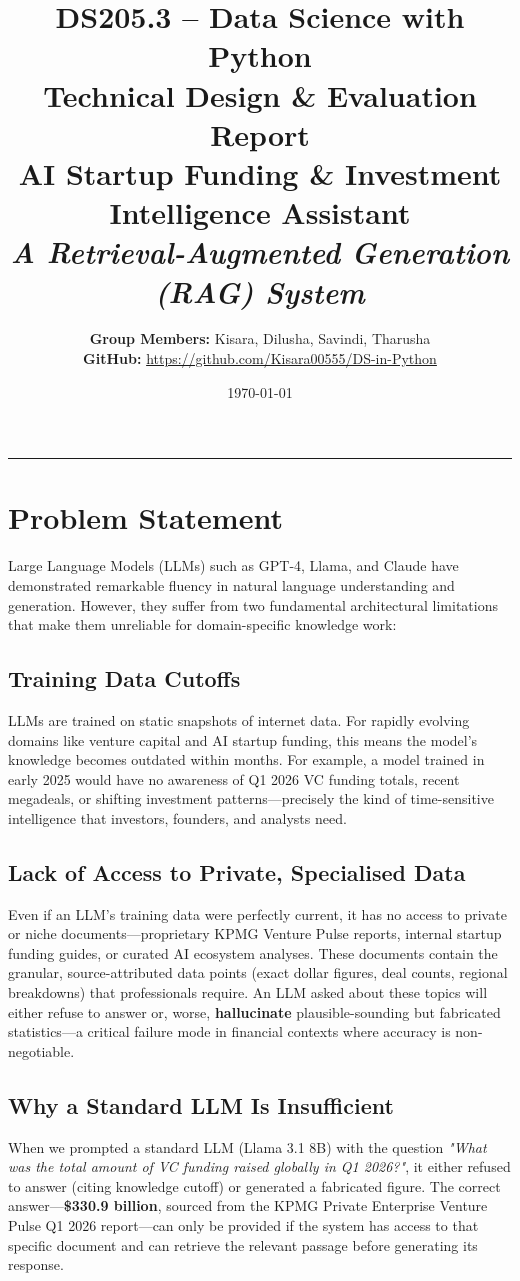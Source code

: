 \documentclass[11pt, a4paper]{article}
\title{
    \vspace{-1.5cm}
    \textbf{DS205.3 -- Data Science with Python} \\
    \Large Technical Design \& Evaluation Report \\
    \large AI Startup Funding \& Investment Intelligence Assistant \\
    \normalsize \textit{A Retrieval-Augmented Generation (RAG) System}
}
\author{\textbf{Group Members:} Kisara, Dilusha, Savindi, Tharusha \\
\small \textbf{GitHub:} \url{https://github.com/Kisara00555/DS-in-Python}}
\date{\today}
\begin{document}
\maketitle

\hrule
\vspace{0.5cm}

\section{Problem Statement}

Large Language Models (LLMs) such as GPT-4, Llama, and Claude have demonstrated remarkable fluency in natural language understanding and generation. However, they suffer from two fundamental architectural limitations that make them unreliable for domain-specific knowledge work:

\subsection{Training Data Cutoffs}
LLMs are trained on static snapshots of internet data. For rapidly evolving domains like venture capital and AI startup funding, this means the model's knowledge becomes outdated within months. For example, a model trained in early 2025 would have no awareness of Q1 2026 VC funding totals, recent megadeals, or shifting investment patterns---precisely the kind of time-sensitive intelligence that investors, founders, and analysts need.

\subsection{Lack of Access to Private, Specialised Data}
Even if an LLM's training data were perfectly current, it has no access to private or niche documents---proprietary KPMG Venture Pulse reports, internal startup funding guides, or curated AI ecosystem analyses. These documents contain the granular, source-attributed data points (exact dollar figures, deal counts, regional breakdowns) that professionals require. An LLM asked about these topics will either refuse to answer or, worse, \textbf{hallucinate} plausible-sounding but fabricated statistics---a critical failure mode in financial contexts where accuracy is non-negotiable.

\subsection{Why a Standard LLM Is Insufficient}
When we prompted a standard LLM (Llama 3.1 8B) with the question \textit{"What was the total amount of VC funding raised globally in Q1 2026?"}, it either refused to answer (citing knowledge cutoff) or generated a fabricated figure. The correct answer---\textbf{\$330.9 billion}, sourced from the KPMG Private Enterprise Venture Pulse Q1 2026 report---can only be provided if the system has access to that specific document and can retrieve the relevant passage before generating its response.
\end{document}
